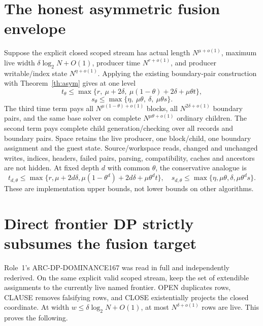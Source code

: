 \documentclass[11pt]{article}
\begin{document}
\section{The honest asymmetric fusion envelope}
Suppose the explicit closed scoped stream has actual length
$N^{\mu+o(1)}$, maximum live width $\delta\log_2N+O(1)$, producer time
$N^{r+o(1)}$, and producer writable/index state $N^{\eta+o(1)}$.  Applying
the existing boundary-pair construction with Theorem~\ref{th:asym} gives at
one level
\[
 t_\theta\le
 \max\{r,\ \mu+2\delta,\
 \mu(1-\theta)+2\delta+\mu\theta t\},                    \tag{3}
\]
\[
 s_\theta\le
 \max\{\eta,\ \mu\theta,\ \delta,\ \mu\theta s\}.     \tag{4}
\]
The third time term pays all $N^{\mu(1-\theta)+o(1)}$ blocks, all
$N^{2\delta+o(1)}$ boundary pairs, and the same base solver on complete
$N^{\mu\theta+o(1)}$ ordinary children.  The second term pays complete
child generation/checking over all records and boundary pairs.  Space
retains the live producer, one block/child, one boundary assignment and the
guest state.  Source/workspace reads, changed and unchanged writes, indices,
headers, failed pairs, parsing, compatibility, caches and ancestors are not
hidden.  At fixed depth $d$ with common $\theta$, the conservative analogue is
\[
 t_{d,\theta}\le\max\{r,\mu+2d\delta,
 \mu(1-\theta^d)+2d\delta+\mu\theta^d t\},
\quad
 s_{d,\theta}\le\max\{\eta,\mu\theta,\delta,
 \mu\theta^d s\}.                                       \tag{5}
\]
These are implementation upper bounds, not lower bounds on other algorithms.

\section{Direct frontier DP strictly subsumes the fusion target}
Role~1's ARC-DP-DOMINANCE167 was read in full and independently rederived.
On the same explicit valid scoped stream, keep the set of extendible
assignments to the currently live named frontier.  OPEN duplicates rows,
CLAUSE removes falsifying rows, and CLOSE existentially projects the closed
coordinate.  At width $w\le\delta\log_2N+O(1)$, at most
$N^{\delta+o(1)}$ rows are live.  This proves the following.
\end{document}
